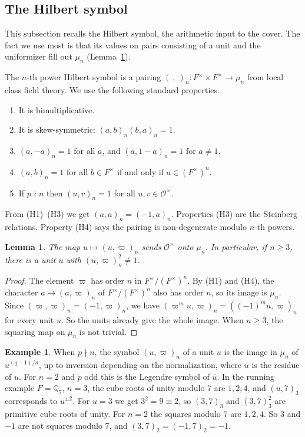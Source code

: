 \documentclass[12pt,letterpaper]{amsart}
\numberwithin{equation}{section}
\newtheorem{lemma}[theorem]{Lemma}
\theoremstyle{definition}
\newtheorem{example}[theorem]{Example}
\theoremstyle{remark}
\newcommand{\cO}{\mathcal{O}}
\begin{document}
\subsection{The Hilbert symbol}
This subsection recalls the Hilbert symbol, the arithmetic input to the
cover. The fact we use most is that its values on pairs consisting of a
unit and the uniformizer fill out $\mu_n$ (Lemma~\ref{lemma:hilbert}).

The $n$-th power Hilbert symbol is a pairing
$(\ ,\ )_n:F^\times\times F^\times\to\mu_n$ from local class field
theory. We use the following standard properties.
\begin{enumerate}[leftmargin=3.2em]
\item[(H1)] It is bimultiplicative.
\item[(H2)] It is skew-symmetric: $(a,b)_n(b,a)_n=1$.
\item[(H3)] $(a,-a)_n=1$ for all $a$, and $(a,1-a)_n=1$ for $a\neq 1$.
\item[(H4)] $(a,b)_n=1$ for all $b\in F^\times$ if and only if
$a\in (F^\times)^n$.
\item[(H5)] If $p\nmid n$ then $(u,v)_n=1$ for all $u,v\in\cO^\times$.
\end{enumerate}
From (H1)--(H3) we get $(a,a)_n=(-1,a)_n$. Properties (H3) are the
Steinberg relations. Property (H4) says the pairing is non-degenerate
modulo $n$-th powers.

\begin{lemma}
\label{lemma:hilbert}
The map $u\mapsto (u,\varpi)_n$ sends $\cO^\times$ onto $\mu_n$. In
particular, if $n\geq 3$, there is a unit $u$ with
$(u,\varpi)_n^2\neq 1$.
\end{lemma}

\begin{proof}
The element $\varpi$ has order $n$ in $F^\times/(F^\times)^n$. By (H1)
and (H4), the character $a\mapsto (a,\varpi)_n$ of
$F^\times/(F^\times)^n$ also has order $n$, so its image is $\mu_n$.
Since $(\varpi,\varpi)_n=(-1,\varpi)_n$, we have
$(\varpi^mu,\varpi)_n=((-1)^mu,\varpi)_n$ for every unit $u$. So the
units already give the whole image. When $n\geq 3$, the squaring map
on $\mu_n$ is not trivial.
\end{proof}

\begin{example}
\label{ex:hilbert}
When $p\nmid n$, the symbol $(u,\varpi)_n$ of a unit $u$ is the image
in $\mu_n$ of $\bar u^{(q-1)/n}$, up to inversion depending on the
normalization, where $\bar u$ is the residue of $u$. For $n=2$ and $p$
odd this is the Legendre symbol of $\bar u$. In the running example
$F=\mathbb{Q}_7$, $n=3$, the cube roots of unity modulo $7$ are
$1,2,4$, and $(u,7)_3$ corresponds to $\bar u^{\pm 2}$. For $u=3$ we get
$3^2=9\equiv 2$, so $(3,7)_3$ and $(3,7)_3^2$ are primitive cube roots
of unity. For $n=2$ the squares modulo $7$ are $1,2,4$. So $3$ and $-1$
are not squares modulo $7$, and $(3,7)_2=(-1,7)_2=-1$.
\end{example}
\end{document}
